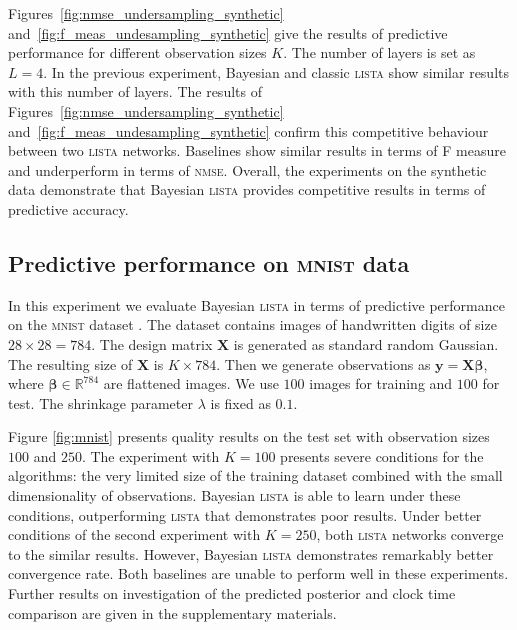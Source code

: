 \documentclass{article}
\begin{document}
Figures~\ref{fig:nmse_undersampling_synthetic} and~\ref{fig:f_meas_undesampling_synthetic} give the results of predictive performance for different observation sizes $K$. The number of layers is set as $L=4$. In the previous experiment, Bayesian and classic \textsc{lista} show similar results with this number of layers. The results of Figures~\ref{fig:nmse_undersampling_synthetic} and~\ref{fig:f_meas_undesampling_synthetic} confirm this competitive behaviour between two \textsc{lista} networks. Baselines show similar results in terms of F measure and underperform in terms of \textsc{nmse}. Overall, the experiments on the synthetic data demonstrate that Bayesian \textsc{lista} provides competitive results in terms of predictive accuracy.



\subsection{Predictive performance on \textsc{mnist} data}
In this experiment we evaluate Bayesian \textsc{lista} in terms of predictive performance on the \textsc{mnist} dataset \cite{lecun1998gradient}. The dataset contains images of handwritten digits of size $28 \times 28 = 784$. The design matrix $\mathbf{X}$ is generated as standard random Gaussian. The resulting size of $\mathbf{X}$ is $K \times 784$. Then we generate observations as $\mathbf{y} = \mathbf{X}\boldsymbol\beta$, where $\boldsymbol\beta \in \mathbb{R}^{784}$ are flattened images. We use $100$ images for training and $100$ for test. The shrinkage parameter $\lambda$ is fixed as $0.1$.

Figure \ref{fig:mnist} presents quality results on the test set with observation sizes $100$ and $250$. The experiment with $K=100$ presents severe conditions for the algorithms: the very limited size of the training dataset combined with the small dimensionality of observations. Bayesian \textsc{lista} is able to learn under these conditions, outperforming \textsc{lista} that demonstrates poor results. Under better conditions of the second experiment with $K=250$, both \textsc{lista} networks converge to the similar results. However, Bayesian \textsc{lista} demonstrates remarkably better convergence rate. Both baselines are unable to perform well in these experiments. Further results on investigation of the predicted posterior and clock time comparison are given in the supplementary materials.
\end{document}
